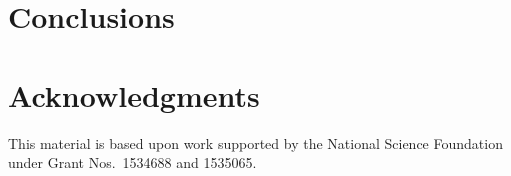 \documentclass[preprint]{elsarticle}
\begin{document}
\section{Conclusions}


\section*{Acknowledgments}

This material is based upon work supported by the National Science Foundation under Grant Nos.~1534688 and 1535065.


\pagebreak



\end{document}
